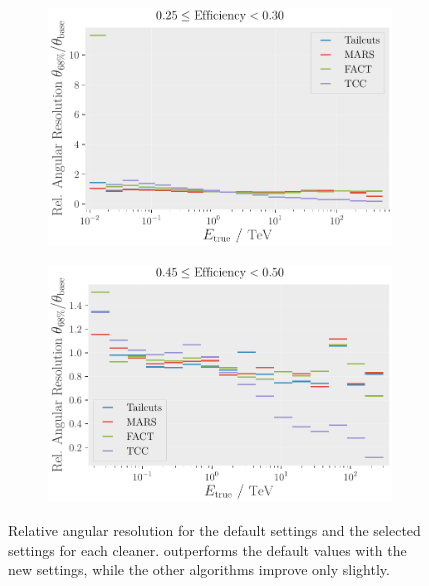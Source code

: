 \begin{figure}
    \centering
    \begin{subfigure}[t]{0.45\textwidth}
        \centering
        \includegraphics[width=\textwidth]{plots/ar_aeff/Rel_AR_0.25_0.30_base.pdf}
    \end{subfigure}
    \hfill
    \begin{subfigure}[t]{0.45\textwidth}
        \centering
        \includegraphics[width=\textwidth]{plots/ar_aeff/Rel_AR_0.45_0.50_base.pdf}
    \end{subfigure}
    \caption{Relative angular resolution for the default settings and the selected settings for each cleaner.
    \tcc{} outperforms the default values with the new settings, while the other algorithms improve only slightly.}
    \label{fig:rel_angres}
\end{figure}

